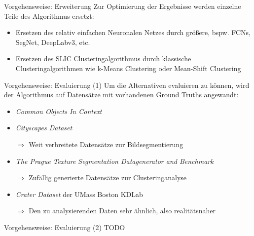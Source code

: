 \documentclass[9pt]{beamer}
\begin{document}
\begin{frame}{Vorgehensweise: Erweiterung}
Zur Optimierung der Ergebnisse werden einzelne Teile des Algorithmus ersetzt:
\begin{itemize}
	\item Ersetzen des relativ einfachen Neuronalen Netzes durch größere, bspw. FCNs, SegNet, DeepLabv3, etc.
	\item Ersetzen des SLIC Clusteringalgorithmus durch klassische Clusteringalgorithmen wie k-Means Clustering oder Mean-Shift Clustering
\end{itemize}
\end{frame}

\begin{frame}{Vorgehensweise: Evaluierung (1)}
Um die Alternativen evaluieren zu können, wird der Algorithmus auf Datensätze mit vorhandenen Ground Truths angewandt:
\medskip
\begin{itemize}
	\item \textit{Common Objects In Context}\footnotemark[1]
	\item \textit{Cityscapes Dataset}\footnotemark[2]
	\item[$\Rightarrow$] Weit verbreitete Datensätze zur Bildsegmentierung
	\medskip
	\item \textit{The Prague Texture Segmentation Datagenerator and Benchmark}\footnotemark[3]
	\item[$\Rightarrow$] Zufällig generierte Datensätze zur Clusteringanalyse
	\medskip
	\item \textit{Crater Dataset} der UMass Boston
	 KDLab\footnotemark[4]
	\item[$\Rightarrow$] Den zu analysierenden Daten sehr ähnlich, also realitätsnaher
\end{itemize}
\end{frame}

\begin{frame}{Vorgehensweise: Evaluierung (2)}
	TODO
\end{frame}
\end{document}
